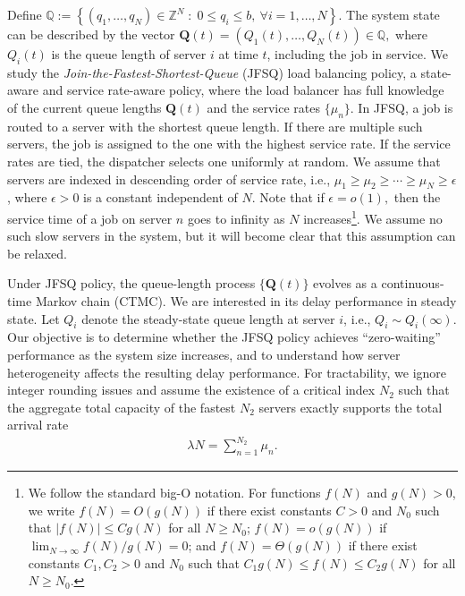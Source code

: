 \documentclass[11pt,oneside,letter]{article}
\begin{document}
{Define 
$\mathbb{Q} := \left\{ (q_1,\dots,q_N) \in \mathbb{Z}^N \;:\; 0 \le q_i \le b,\ \forall i=1,\dots,N \right\}.$}
The system state can be described by the vector $\mathbf{Q}(t)=(Q_1(t),\dots,Q_N(t)) \in \mathbb Q,$ where $Q_i(t)$ is the queue length of server $i$ at time $t$, including the job in service. We study the \emph{Join-the-Fastest-Shortest-Queue} (JFSQ) load balancing policy, a state-aware and service rate-aware policy, where the load balancer has full knowledge of the current queue lengths $\mathbf{Q}(t)$ and the service rates $\{\mu_n\}$. In JFSQ, a job is routed to a server with the shortest queue length. If there are multiple such servers, the job is assigned to the one with the highest service rate. If the service rates are tied, the dispatcher selects one uniformly at random. We assume that servers are indexed in descending order of service rate, i.e., $\mu_1 \geq \mu_2 \geq \cdots \geq \mu_N \geq \epsilon$, where $\epsilon > 0$ is a constant independent of $N$. Note that if $\epsilon =o(1),$ then the service time of a job on server $n$ goes to infinity as $N$ increases\footnote{ We follow the standard big-O notation.  
For functions $f(N)$ and $g(N)>0$, we write $f(N)=O(g(N))$ if there exist constants $C>0$ and $N_0$ such that $|f(N)|\le C g(N)$ for all $N\ge N_0$; 
$f(N)=o(g(N))$ if $\lim_{N\to\infty} f(N)/g(N)=0$; and 
$f(N)=\Theta(g(N))$ if there exist constants $C_1,C_2>0$ and $N_0$ such that $C_1 g(N)\le f(N)\le C_2 g(N)$ for all $N\ge N_0$.}. We assume no such slow servers in the system, but it will become clear that this assumption can be relaxed. 

Under JFSQ policy, the queue-length process $\{\mathbf{Q}(t)\}$ evolves as a continuous-time Markov chain (CTMC). We are interested in its delay performance in steady state. Let $Q_i$ denote the steady-state queue length at server $i$, i.e., $Q_i \sim Q_i(\infty)$. {Our objective is to determine whether the JFSQ policy achieves “zero-waiting” performance as the system size increases, and to understand how server heterogeneity affects the resulting delay performance.}
For tractability, we ignore integer rounding issues and assume the existence of a critical index $N_2$ such that the aggregate total capacity of the fastest $N_2$ servers exactly supports the total arrival rate 
\begin{align*}
\lambda N = \sum_{n=1}^{N_2} \mu_n.  
\end{align*}
\end{document}
